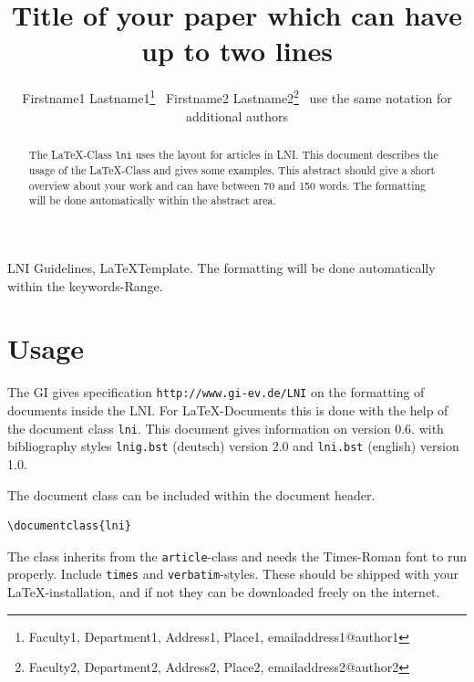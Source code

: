 \documentclass[english]{lni}
\author{Firstname1 Lastname1\footnote{Faculty1, Department1, Address1, Place1, emailaddress1@author1} \, Firstname2 Lastname2\footnote{Faculty2, Department2, Address2, Place2, emailaddress2@author2} \ use the same notation for additional authors}
\title{Title of your paper which can have up to two lines}
\renewcommand{\headrulewidth}{0.4pt} %
\begin{document}
\maketitle

\renewcommand{\refname}{References}
\setcounter{footnote}{2} %
\thispagestyle{titlepage}
\pagestyle{fancy}
\fancyhead{} %
\fancyfoot{} %
\renewcommand{\headrulewidth}{0.4pt} %

\begin{abstract}
The \LaTeX-Class \texttt{lni} uses the layout for articles in LNI. This document describes the usage of the \LaTeX-Class and gives some examples. This abstract should give a short overview about your work and can have between 70 and 150 words. The formatting will be done automatically within the abstract area.
\end{abstract}
\begin{keywords}
LNI Guidelines, \LaTeX Template. The formatting will be done automatically within the keywords-Range.
\end{keywords}

\section{Usage}
The GI gives specification \texttt{http://www.gi-ev.de/LNI} on the formatting of documents inside the LNI. For \LaTeX-Documents this is done with the help of the document class \texttt{lni}. This document gives information on version 0.6. with bibliography styles \texttt{lnig.bst} (deutsch) version 2.0 and \texttt{lni.bst} (english) version 1.0. 

The document class can be included within the document header.

\begin{verbatim}
\documentclass{lni}
\end{verbatim}

The class inherits from the \texttt{article}-class and needs the Times-Roman font to run properly. Include \texttt{times} and \texttt{verbatim}-styles. These should be shipped with your \LaTeX-installation, and if not they can be downloaded freely on the internet.
\end{document}
